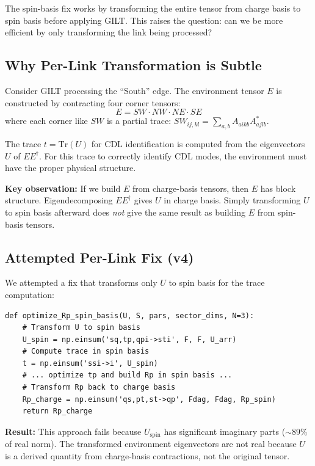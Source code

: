 \documentclass{article}
\begin{document}
The spin-basis fix works by transforming the entire tensor from charge basis to spin basis before applying GILT. This raises the question: can we be more efficient by only transforming the link being processed?

\subsection{Why Per-Link Transformation is Subtle}

Consider GILT processing the ``South'' edge. The environment tensor $E$ is constructed by contracting four corner tensors:
\begin{equation}
    E = SW \cdot NW \cdot NE \cdot SE
\end{equation}
where each corner like $SW$ is a partial trace: $SW_{ij,kl} = \sum_{a,b} A_{aikb} A^*_{ajlb}$.

The trace $t = \text{Tr}(U)$ for CDL identification is computed from the eigenvectors $U$ of $E E^\dagger$. For this trace to correctly identify CDL modes, the environment must have the proper physical structure.

\textbf{Key observation:} If we build $E$ from charge-basis tensors, then $E$ has block structure. Eigendecomposing $E E^\dagger$ gives $U$ in charge basis. Simply transforming $U$ to spin basis afterward does \emph{not} give the same result as building $E$ from spin-basis tensors.

\subsection{Attempted Per-Link Fix (v4)}

We attempted a fix that transforms only $U$ to spin basis for the trace computation:
\begin{lstlisting}
def optimize_Rp_spin_basis(U, S, pars, sector_dims, N=3):
    # Transform U to spin basis
    U_spin = np.einsum('sq,tp,qpi->sti', F, F, U_arr)
    # Compute trace in spin basis
    t = np.einsum('ssi->i', U_spin)
    # ... optimize tp and build Rp in spin basis ...
    # Transform Rp back to charge basis
    Rp_charge = np.einsum('qs,pt,st->qp', Fdag, Fdag, Rp_spin)
    return Rp_charge
\end{lstlisting}

\textbf{Result:} This approach fails because $U_{\text{spin}}$ has significant imaginary parts ($\sim 89\%$ of real norm). The transformed environment eigenvectors are not real because $U$ is a derived quantity from charge-basis contractions, not the original tensor.
\end{document}
